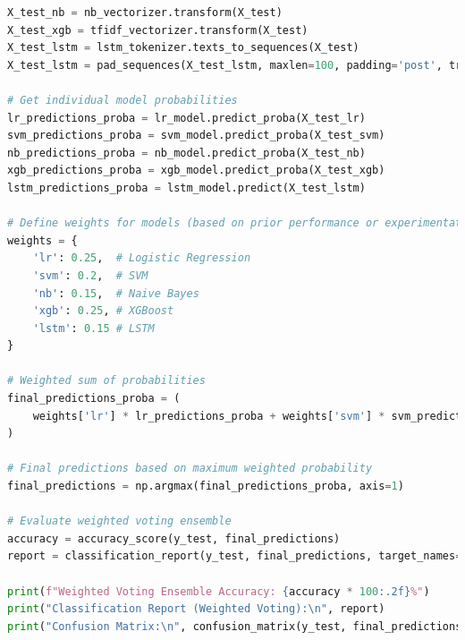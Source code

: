 \begin{tcolorbox}[colback=gray!5!white, colframe=gray!80!black, boxrule=0.5pt, title=Weighted Voting Ensemble for Classification]
    \begin{lstlisting}[language=Python]
X_test_nb = nb_vectorizer.transform(X_test)
X_test_xgb = tfidf_vectorizer.transform(X_test)
X_test_lstm = lstm_tokenizer.texts_to_sequences(X_test)
X_test_lstm = pad_sequences(X_test_lstm, maxlen=100, padding='post', truncating='post')

# Get individual model probabilities
lr_predictions_proba = lr_model.predict_proba(X_test_lr)
svm_predictions_proba = svm_model.predict_proba(X_test_svm)
nb_predictions_proba = nb_model.predict_proba(X_test_nb)
xgb_predictions_proba = xgb_model.predict_proba(X_test_xgb)
lstm_predictions_proba = lstm_model.predict(X_test_lstm)

# Define weights for models (based on prior performance or experimentation)
weights = {
    'lr': 0.25,  # Logistic Regression
    'svm': 0.2,  # SVM
    'nb': 0.15,  # Naive Bayes
    'xgb': 0.25, # XGBoost
    'lstm': 0.15 # LSTM
}

# Weighted sum of probabilities
final_predictions_proba = (
    weights['lr'] * lr_predictions_proba + weights['svm'] * svm_predictions_proba + weights['nb'] * nb_predictions_proba + weights['xgb'] * xgb_predictions_proba + weights['lstm'] * lstm_predictions_proba
)

# Final predictions based on maximum weighted probability
final_predictions = np.argmax(final_predictions_proba, axis=1)

# Evaluate weighted voting ensemble
accuracy = accuracy_score(y_test, final_predictions)
report = classification_report(y_test, final_predictions, target_names=label_encoder.classes_)

print(f"Weighted Voting Ensemble Accuracy: {accuracy * 100:.2f}%")
print("Classification Report (Weighted Voting):\n", report)
print("Confusion Matrix:\n", confusion_matrix(y_test, final_predictions))
    \end{lstlisting}
\end{tcolorbox}

